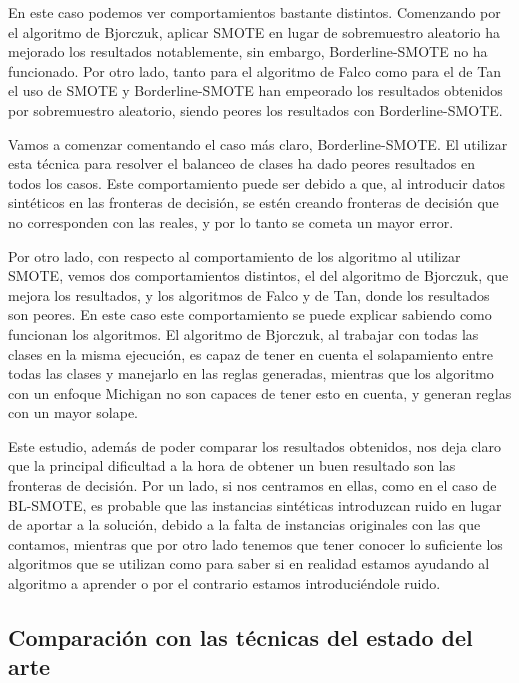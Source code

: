 En este caso podemos ver comportamientos bastante distintos. Comenzando por el algoritmo de Bjorczuk, aplicar SMOTE en lugar de sobremuestro aleatorio ha mejorado los resultados notablemente, sin embargo, Borderline-SMOTE no ha funcionado. Por otro lado, tanto para el algoritmo de Falco como para el de Tan el uso de SMOTE y Borderline-SMOTE han empeorado los resultados obtenidos por sobremuestro aleatorio, siendo peores los resultados con Borderline-SMOTE.

Vamos a comenzar comentando el caso más claro, Borderline-SMOTE. El utilizar esta técnica para resolver el balanceo de clases ha dado peores resultados en todos los casos. Este comportamiento puede ser debido a que, al introducir datos sintéticos en las fronteras de decisión, se estén creando fronteras de decisión que no corresponden con las reales, y por lo tanto se cometa un mayor error.

Por otro lado, con respecto al comportamiento de los algoritmo al utilizar SMOTE, vemos dos comportamientos distintos, el del algoritmo de Bjorczuk, que mejora los resultados, y los algoritmos de Falco y de Tan, donde los resultados son peores. En este caso este comportamiento se puede explicar sabiendo como funcionan los algoritmos. El algoritmo de Bjorczuk, al trabajar con todas las clases en la misma ejecución, es capaz de tener en cuenta el solapamiento entre todas las clases y manejarlo en las reglas generadas, mientras que los algoritmo con un enfoque Michigan no son capaces de tener esto en cuenta, y generan reglas con un mayor solape.

Este estudio, además de poder comparar los resultados obtenidos, nos deja claro que la principal dificultad a la hora de obtener un buen resultado son las fronteras de decisión. Por un lado, si nos centramos en ellas, como en el caso de BL-SMOTE, es probable que las instancias sintéticas introduzcan ruido en lugar de aportar a la solución, debido a la falta de instancias originales con las que contamos, mientras que por otro lado tenemos que tener conocer lo suficiente los algoritmos que se utilizan como para saber si en realidad estamos ayudando al algoritmo a aprender o por el contrario estamos introduciéndole ruido.

\newpage

\subsection{Comparación con las técnicas del estado del arte}

